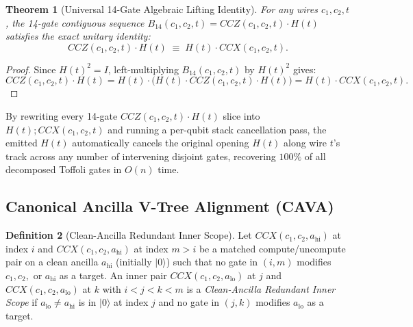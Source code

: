 \documentclass[11pt,a4paper]{article}
\newtheorem{theorem}{Theorem}[section]
\theoremstyle{definition}
\newtheorem{definition}[theorem]{Definition}
\begin{document}
\begin{theorem}[Universal 14-Gate Algebraic Lifting Identity]
\label{thm:lifting}
For any wires $c_1, c_2, t$, the 14-gate contiguous sequence $B_{14}(c_1, c_2, t) = \mathit{CCZ}(c_1, c_2, t) \cdot H(t)$ satisfies the exact unitary identity:
\[
  \mathit{CCZ}(c_1, c_2, t) \cdot H(t) \;\equiv\; H(t) \cdot \mathit{CCX}(c_1, c_2, t).
\]
\end{theorem}
\begin{proof}
Since $H(t)^2 = I$, left-multiplying $B_{14}(c_1, c_2, t)$ by $H(t)^2$ gives:
\[
  \mathit{CCZ}(c_1, c_2, t) \cdot H(t) = H(t) \cdot \big(H(t) \cdot \mathit{CCZ}(c_1, c_2, t) \cdot H(t)\big) = H(t) \cdot \mathit{CCX}(c_1, c_2, t).
\]
\end{proof}
By rewriting every 14-gate $\mathit{CCZ}(c_1, c_2, t) \cdot H(t)$ slice into $H(t) ; \mathit{CCX}(c_1, c_2, t)$ and running a per-qubit stack cancellation pass, the emitted $H(t)$ automatically cancels the original opening $H(t)$ along wire $t$'s track across any number of intervening disjoint gates, recovering $100\%$ of all decomposed Toffoli gates in $O(n)$ time.

\subsection{Canonical Ancilla V-Tree Alignment (\textsc{CAVA})}

\begin{definition}[Clean-Ancilla Redundant Inner Scope]
Let $\mathit{CCX}(c_1, c_2, a_{\mathrm{hi}})$ at index $i$ and $\mathit{CCX}(c_1, c_2, a_{\mathrm{hi}})$ at index $m > i$ be a matched compute/uncompute pair on a clean ancilla $a_{\mathrm{hi}}$ (initially $|0\rangle$) such that no gate in $(i, m)$ modifies $c_1, c_2,$ or $a_{\mathrm{hi}}$ as a target. An inner pair $\mathit{CCX}(c_1, c_2, a_{\mathrm{lo}})$ at $j$ and $\mathit{CCX}(c_1, c_2, a_{\mathrm{lo}})$ at $k$ with $i < j < k < m$ is a \emph{Clean-Ancilla Redundant Inner Scope} if $a_{\mathrm{lo}} \neq a_{\mathrm{hi}}$ is in $|0\rangle$ at index $j$ and no gate in $(j, k)$ modifies $a_{\mathrm{lo}}$ as a target.
\end{definition}
\end{document}
